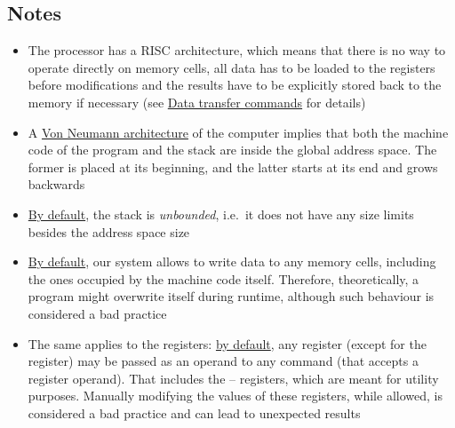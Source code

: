 \hypertarget{standard:notes}{
    \subsection{Notes}
}

\begin{itemize}
    \item The  processor has a RISC architecture,
    which means that there is no way to operate directly on memory cells,
    all data has to be loaded to the registers before modifications and
    the results have to be explicitly stored back to the memory if necessary
    (see \hyperlink{cmd:data_transfer}{Data transfer commands} for details)

    \item A \href{https://en.wikipedia.org/wiki/Von_Neumann_architecture}
    {Von Neumann architecture} of the  computer implies that
    both the machine code of the program and the stack are inside the
    global address space.
    The former is placed at its beginning, and the latter starts at its end
    and grows backwards

    \item \hyperlink{config}{By default}, the stack is \textit{unbounded},
    i.e.\ it does not have any size limits besides the address space size

    \item \hyperlink{config}{By default}, our system allows to write data
    to any memory cells, including the ones occupied by the machine code itself.
    Therefore, theoretically, a program might overwrite itself during runtime,
    although such behaviour is considered a bad practice

    \item The same applies to the registers: \hyperlink{config}{by default},
    any register (except for the  register) may be passed as
    an operand to any command (that accepts a register operand).
    That includes the -- registers, which are meant
    for utility purposes.
    Manually modifying the values of these registers, while allowed,
    is considered a bad practice and can lead to unexpected results
\end{itemize}
